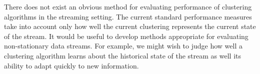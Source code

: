 There does not exist an obvious method for evaluating performance of clustering algorithms in the streaming setting. The current standard performance measures take into account only how well the current clustering represents the current state of the stream. It would be useful to develop methods appropriate for evaluating non-stationary data streams. For example, we might wish to judge how well a clustering algorithm learns about the historical state of the stream as well its ability to adapt quickly to new information.
